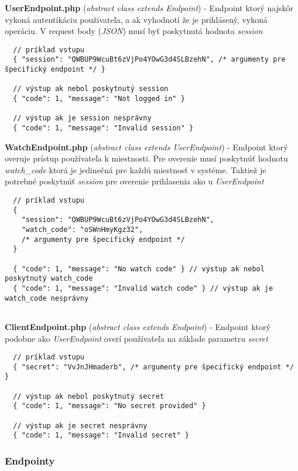 \documentclass{article}
\newcommand{\filedesc}[1]{\vspace{0.3cm} \noindent \textbf{#1}}
\begin{document}
\filedesc{UserEndpoint.php} (\emph{abstract class extends Endpoint}) - Endpoint ktorý najskôr vykoná autentikáciu použivateľa, a ak vyhodnotí že je prihlásený, vykoná operáciu. V request body (\emph{JSON}) musí byť poskytnutá hodnota \emph{session}

\begin{verbatim}
  // príklad vstupu
  { "session": "QWBUP9WcuBt6zVjPo4YOwG3d4SLBzehN", /* argumenty pre špecifický endpoint */ }

  // výstup ak nebol poskytnutý session
  { "code": 1, "message": "Not logged in" }
  
  // výstup ak je session nesprávny
  { "code": 1, "message": "Invalid session" }
\end{verbatim}

\filedesc{WatchEndpoint.php} (\emph{abstract class extends UserEndpoint}) - Endpoint ktorý overuje prístup používateľa k miestnosti. Pre overenie musí poskytnúť hodnotu \emph{watch{\_}code} ktorá je jedinečná pre každú miestnosť v systéme. Taktiež je potrebné poskytnúť \emph{session} pre overenie prihlasenia ako u \emph{UserEndpoint}

\begin{verbatim}
  // príklad vstupu
  {
    "session": "QWBUP9WcuBt6zVjPo4YOwG3d4SLBzehN",
    "watch_code": "oSWnHmyKgz32",
    /* argumenty pre špecifický endpoint */
  }
  
  { "code": 1, "message": "No watch code" } // výstup ak nebol poskytnutý watch_code
  { "code": 1, "message": "Invalid watch code" } // výstup ak je watch_code nesprávny
  
\end{verbatim}

\filedesc{ClientEndpoint.php} (\emph{abstract class extends Endpoint}) - Endpoint ktorý podobne ako \emph{UserEndpoint} overí používaťeľa na základe parametru \emph{secret}

\begin{verbatim}
  // príklad vstupu
  { "secret": "VvJnJHmaderb", /* argumenty pre špecifický endpoint */ }
  
  // výstup ak nebol poskytnutý secret
  { "code": 1, "message": "No secret provided" }
  
  // výstup ak je secret nesprávny
  { "code": 1, "message": "Invalid secret" }
\end{verbatim}

\subsubsection{Endpointy}
\end{document}
